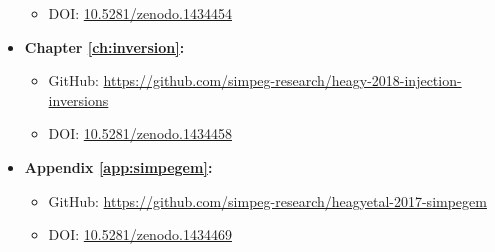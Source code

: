 \begin{itemize}
{\begin{itemize}
{                GitHub: \href{https://github.com/simpeg-research/heagy-2018-em-casing}{https://github.com/simpeg-research/heagy-2018-em-casing}
            }
            \item{
                DOI: \href{https://doi.org/10.5281/zenodo.1434454}{10.5281/zenodo.1434454}
            }
        \end{itemize}
    }
    \item{\textbf{Chapter \ref{ch:inversion}:}
        \begin{itemize}
            \item{
                GitHub: \href{https://github.com/simpeg-research/heagy-2018-injection-inversions}{https://github.com/simpeg-research/heagy-2018-injection-inversions}
            }
            \item{
                DOI: \href{https://doi.org/10.5281/zenodo.1434458}{10.5281/zenodo.1434458}
            }
        \end{itemize}
    }
    \item{\textbf{Appendix \ref{app:simpegem}:}
        \begin{itemize}
            \item{
                GitHub: \href{https://github.com/simpeg-research/heagyetal-2017-simpegem}{https://github.com/simpeg-research/heagyetal-2017-simpegem}
            }
            \item{
                DOI: \href{https://doi.org/10.5281/zenodo.1434469}{10.5281/zenodo.1434469}
            }
        \end{itemize}
    }


\end{itemize}


